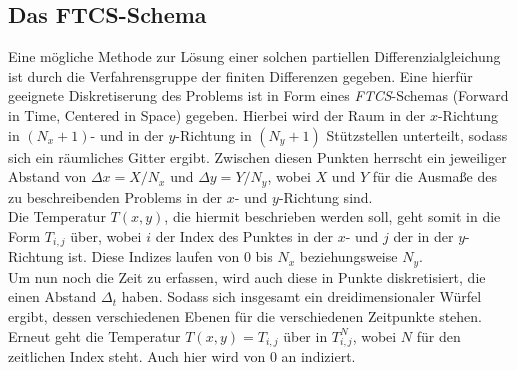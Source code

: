 \documentclass[12pt,a4paper,titlepage,headinclude,bibtotoc]{scrartcl}
\begin{document}
\subsection{Das FTCS-Schema}
\label{sec:ftcs}
Eine mögliche Methode zur Lösung einer solchen partiellen Differenzialgleichung ist durch die Verfahrensgruppe der finiten Differenzen gegeben. Eine hierfür geeignete Diskretiserung des Problems ist in Form eines \textit{FTCS}-Schemas (Forward in Time, Centered in Space) gegeben. Hierbei wird der Raum in der $x$-Richtung in $(N_x+1)$- und in der $y$-Richtung in $(N_y+1)$ Stützstellen unterteilt, sodass sich ein räumliches Gitter ergibt. Zwischen diesen Punkten herrscht ein jeweiliger Abstand von $\Delta x = X/N_x$ und $\Delta y = Y/N_y$, wobei $X$ und $Y$ für die Ausmaße des zu beschreibenden Problems in der $x$- und $y$-Richtung sind.\\
Die Temperatur $T(x, y)$, die hiermit beschrieben werden soll, geht somit in die Form $T_{i,j}$ über, wobei $i$ der Index des Punktes in der $x$- und $j$ der in der $y$-Richtung ist. Diese Indizes laufen von $0$ bis $N_x$ beziehungsweise $N_y$.\\
Um nun noch die Zeit zu erfassen, wird auch diese in Punkte diskretisiert, die einen Abstand $\Delta_t$ haben. Sodass sich insgesamt ein dreidimensionaler Würfel ergibt, dessen verschiedenen Ebenen für die verschiedenen Zeitpunkte stehen. Erneut geht die Temperatur $T(x, y) = T_{i,j}$ über in $T_{i,j}^N$, wobei $N$ für den zeitlichen Index steht. Auch hier wird von $0$ an indiziert.\\
\end{document}
